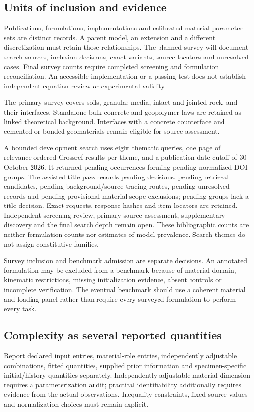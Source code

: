 \documentclass[11pt,a4paper]{article}
\providecommand{\SurveyOccurrenceCount}{pending}
\providecommand{\SurveyPublicationCount}{pending}
\providecommand{\SurveyTitleDecisionCount}{pending}
\providecommand{\SurveyUntitledCount}{pending}
\providecommand{\SurveyRetrieveCount}{pending}
\providecommand{\SurveyBackgroundCount}{pending}
\providecommand{\SurveyUnresolvedCount}{pending}
\providecommand{\SurveyOutsideScopeCount}{pending}
\begin{document}
\subsection{Units of inclusion and evidence}
Publications, formulations, implementations and calibrated material parameter sets are distinct records. A parent model, an extension and a different discretization must retain those relationships. The planned survey will document search sources, inclusion decisions, exact variants, source locators and unresolved cases. Final survey counts require completed screening and formulation reconciliation. An accessible implementation or a passing test does not establish independent equation review or experimental validity.

The primary survey covers soils, granular media, intact and jointed rock, and their interfaces. Standalone bulk concrete and geopolymer laws are retained as linked theoretical background. Interfaces with a concrete counterface and cemented or bonded geomaterials remain eligible for source assessment.

A bounded development search uses eight thematic queries, one page of relevance-ordered Crossref results per theme, and a publication-date cutoff of 30 October 2026. It returned \SurveyOccurrenceCount{} occurrences forming \SurveyPublicationCount{} normalized DOI groups. The assisted title pass records \SurveyTitleDecisionCount{} decisions: \SurveyRetrieveCount{} retrieval candidates, \SurveyBackgroundCount{} background/source-tracing routes, \SurveyUnresolvedCount{} unresolved records and \SurveyOutsideScopeCount{} provisional material-scope exclusions; \SurveyUntitledCount{} groups lack a title decision. Exact requests, response hashes and item locators are retained. Independent screening review, primary-source assessment, supplementary discovery and the final search depth remain open. These bibliographic counts are neither formulation counts nor estimates of model prevalence. Search themes do not assign constitutive families.

Survey inclusion and benchmark admission are separate decisions. An annotated formulation may be excluded from a benchmark because of material domain, kinematic restrictions, missing initialization evidence, absent controls or incomplete verification. The eventual benchmark should use a coherent material and loading panel rather than require every surveyed formulation to perform every task.

\subsection{Complexity as several reported quantities}
Report declared input entries, material-role entries, independently adjustable combinations, fitted quantities, supplied prior information and specimen-specific initial/history quantities separately. Independently adjustable material dimension requires a parameterization audit; practical identifiability additionally requires evidence from the actual observations. Inequality constraints, fixed source values and normalization choices must remain explicit.
\end{document}
